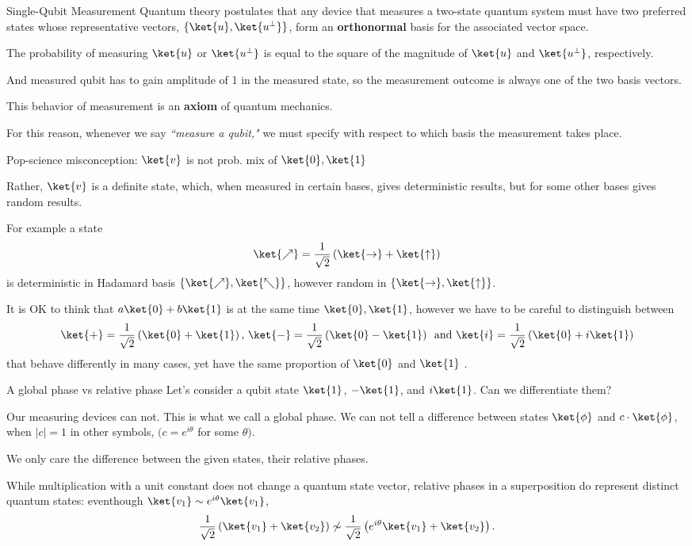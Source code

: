 \documentclass[10pt]{beamer}
\newcommand{\horiz}[0]{\ket{\rightarrow}}
\newcommand{\verti}[0]{\ket{\uparrow}}
\begin{document}
\begin{frame}[fragile]{Single-Qubit Measurement}
    Quantum theory postulates that any device that measures a two-state quantum system must have two preferred states whose representative vectors, $\{\ket{u}, \ket{u^{\perp}}\}$, form an \textbf{orthonormal} basis for the associated vector space.
    
    The probability of measuring $\ket{u}$ or $\ket{u^{\perp}}$ is equal to the square of the magnitude of $\ket{u}$ and $\ket{u^{\perp}}$, respectively. 
    
    And measured qubit has to gain amplitude of 1 in the measured state, so the measurement outcome is always one of the two basis vectors.
    
    This behavior of measurement is an \textbf{axiom} of quantum mechanics.
    
    For this reason, whenever we say \textit{“measure a qubit,"} we must specify with respect to which basis the measurement takes place.
\end{frame}

\begin{frame}[fragile]{Pop-science misconception: $\ket{v}$ is not prob. mix of $\ket{0}, \ket{1}$}

Rather, $\ket{v}$ is a definite state, which, when measured in certain bases, gives deterministic results, but for some other bases gives random results. 

For example a state $$\ket{\nearrow} = \frac{1}{\sqrt{2}} \left(\horiz + \verti \right)$$ is deterministic in Hadamard basis $\{\ket{\nearrow}, \ket{\nwarrow}\}$, however random in $\{\horiz, \verti\}$.

It is OK to think that $a\ket{0} + b\ket{1}$ is at the same time $\ket{0}, \ket{1}$, however we have to be careful to distinguish between $$\ket{+} = \frac{1}{\sqrt{2}}\left(\ket{0} + \ket{1}\right),\,\ket{-} = \frac{1}{\sqrt{2}}\left(\ket{0} - \ket{1}\right)\, \text{ and } \ket{i} = \frac{1}{\sqrt{2}}\left(\ket{0} + i\ket{1}\right)$$ that behave differently in many cases, yet have the same proportion of $\ket{0}$ and $\ket{1}$ .
\end{frame}

\begin{frame}[fragile]{A global phase vs relative phase} 
    Let's consider a qubit state $\ket{1}$, $-\ket{1}$, and $i\ket{1}$. Can we differentiate them? 
    
    Our measuring devices can not. This is what we call a global phase. We can not tell a difference between states $\ket{\phi}$ and $c \cdot \ket{\phi}$, when $|c| = 1$ in other symbols, $(c = e^{i\theta}$ for some $\theta)$.
    
    We only care the difference between the given states, their relative phases. 
    
    While multiplication with a unit constant does not change a quantum state vector, relative phases in a superposition do represent distinct quantum states: eventhough $\ket{v_1} \sim e^{i\theta} \ket{v_1}$, $$\frac{1}{\sqrt{2}}\left(\ket{v_1} + \ket{v_2}\right) \not\sim \frac{1}{\sqrt{2}}\left( e^{i\theta} \ket{v_1} + \ket{v_2}\right).$$
    
    
\end{frame}
\end{document}
